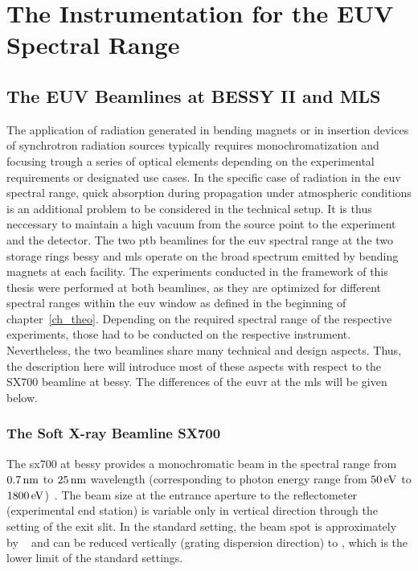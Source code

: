 \section{The Instrumentation for the EUV Spectral Range}
\subsection{The EUV Beamlines at BESSY II and MLS}
The application of radiation generated in bending magnets or in insertion devices of synchrotron radiation sources typically requires monochromatization and focusing trough a series of optical elements depending on the experimental requirements or designated use cases. In the specific case of radiation in the \gls{euv} spectral range, quick absorption during propagation under atmospheric conditions is an additional problem to be considered in the technical setup. It is thus neccessary to maintain a high vacuum from the source point to the experiment and the detector. The two \gls{ptb} beamlines for the \gls{euv} spectral range at the two storage rings \gls{bessy} and \gls{mls} operate on the broad spectrum emitted by bending magnets at each facility. The experiments conducted in the framework of this thesis were performed at both beamlines, as they are optimized for different spectral ranges within the \gls{euv} window as defined in the beginning of chapter~\ref{ch_theo}.  Depending on the required spectral range of the respective experiments, those had to be conducted on the respective instrument. Nevertheless, the two beamlines share many technical and design aspects. Thus, the description here will introduce most of these aspects with respect to the SX700 beamline at \gls{bessy}. The differences of the \gls{euvr} at the \gls{mls} will be given below.

\subsubsection{The Soft X-ray Beamline SX700}
The \gls{sx700} at \gls{bessy} provides a monochromatic beam in the spectral range from $\nm{0.7}$ to $\nm{25}$ wavelength (corresponding to photon energy range from $\ev{50}$ to $\ev{1800}$)~\cite{beckhoff_quarter-century_2009}. The beam size at the entrance aperture to the reflectometer (experimental end station) is variable only in vertical direction through the setting of the exit slit. In the standard setting, the beam spot is approximately  by ~\cite{scholze_high-accuracy_2001} and can be reduced vertically (grating dispersion direction) to , which is the lower limit of the standard settings.

